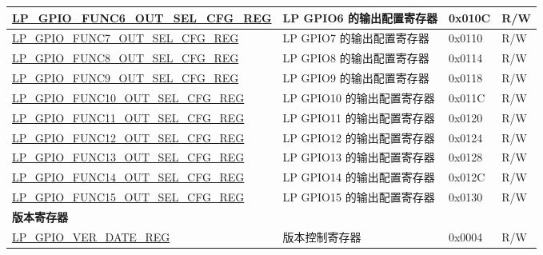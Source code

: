 \begin{longtable}{ | p{6.2cm} | p{6.9cm} | p{1.3cm} | p{1.8cm} | }
\hyperref[regdesc:LPGPIOFUNCNOUTSELCFGREG]{LP\_GPIO\_FUNC6\_OUT\_SEL\_CFG\_REG} & LP GPIO6 的输出配置寄存器 & 0x010C & R/W \\ \hline
\hyperref[regdesc:LPGPIOFUNCNOUTSELCFGREG]{LP\_GPIO\_FUNC7\_OUT\_SEL\_CFG\_REG} & LP GPIO7 的输出配置寄存器 & 0x0110 & R/W \\ \hline
\hyperref[regdesc:LPGPIOFUNCNOUTSELCFGREG]{LP\_GPIO\_FUNC8\_OUT\_SEL\_CFG\_REG} & LP GPIO8 的输出配置寄存器 & 0x0114 & R/W \\ \hline
\hyperref[regdesc:LPGPIOFUNCNOUTSELCFGREG]{LP\_GPIO\_FUNC9\_OUT\_SEL\_CFG\_REG} & LP GPIO9 的输出配置寄存器 & 0x0118 & R/W \\ \hline
\hyperref[regdesc:LPGPIOFUNCNOUTSELCFGREG]{LP\_GPIO\_FUNC10\_OUT\_SEL\_CFG\_REG} & LP GPIO10 的输出配置寄存器 & 0x011C & R/W \\ \hline
\hyperref[regdesc:LPGPIOFUNCNOUTSELCFGREG]{LP\_GPIO\_FUNC11\_OUT\_SEL\_CFG\_REG} & LP GPIO11 的输出配置寄存器 & 0x0120 & R/W \\ \hline
\hyperref[regdesc:LPGPIOFUNCNOUTSELCFGREG]{LP\_GPIO\_FUNC12\_OUT\_SEL\_CFG\_REG} & LP GPIO12 的输出配置寄存器 & 0x0124 & R/W \\ \hline
\hyperref[regdesc:LPGPIOFUNCNOUTSELCFGREG]{LP\_GPIO\_FUNC13\_OUT\_SEL\_CFG\_REG} & LP GPIO13 的输出配置寄存器 & 0x0128 & R/W \\ \hline
\hyperref[regdesc:LPGPIOFUNCNOUTSELCFGREG]{LP\_GPIO\_FUNC14\_OUT\_SEL\_CFG\_REG} & LP GPIO14 的输出配置寄存器 & 0x012C & R/W \\ \hline
\hyperref[regdesc:LPGPIOFUNCNOUTSELCFGREG]{LP\_GPIO\_FUNC15\_OUT\_SEL\_CFG\_REG} & LP GPIO15 的输出配置寄存器 & 0x0130 & R/W \\ \hline
\multicolumn{4}{|l|}{\textbf{版本寄存器}} \\ \hline
\hyperref[regdesc:LPGPIOVERDATEREG]{LP\_GPIO\_VER\_DATE\_REG} & 版本控制寄存器 & 0x0004 & R/W \\ \hline
\end{longtable}
